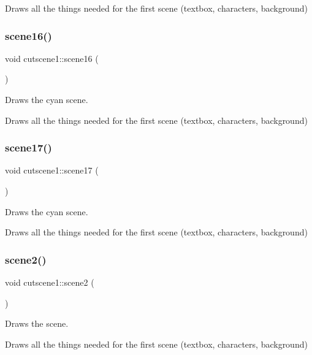 Draws all the things needed for the first scene (textbox, characters, background) \mbox{\label{classcutscene1_a4a414fd614b2d835107d9d8713d1e539}} 
\subsubsection{\texorpdfstring{scene16()}{scene16()}}
{\footnotesize\ttfamily void cutscene1\+::scene16 (\begin{DoxyParamCaption}{ }\end{DoxyParamCaption})}



Draws the cyan scene. 

Draws all the things needed for the first scene (textbox, characters, background) \mbox{\label{classcutscene1_a9706ac15030f2831ecf326894a5031c5}} 
\subsubsection{\texorpdfstring{scene17()}{scene17()}}
{\footnotesize\ttfamily void cutscene1\+::scene17 (\begin{DoxyParamCaption}{ }\end{DoxyParamCaption})}



Draws the cyan scene. 

Draws all the things needed for the first scene (textbox, characters, background) \mbox{\label{classcutscene1_a8ccf64a236d3ddc02d9fe3c1c612495e}} 
\subsubsection{\texorpdfstring{scene2()}{scene2()}}
{\footnotesize\ttfamily void cutscene1\+::scene2 (\begin{DoxyParamCaption}{ }\end{DoxyParamCaption})}



Draws the scene. 

Draws all the things needed for the first scene (textbox, characters, background) \mbox{\label{classcutscene1_a1d3f3933b12bc06b7384bb0f81b00bc0}} 
